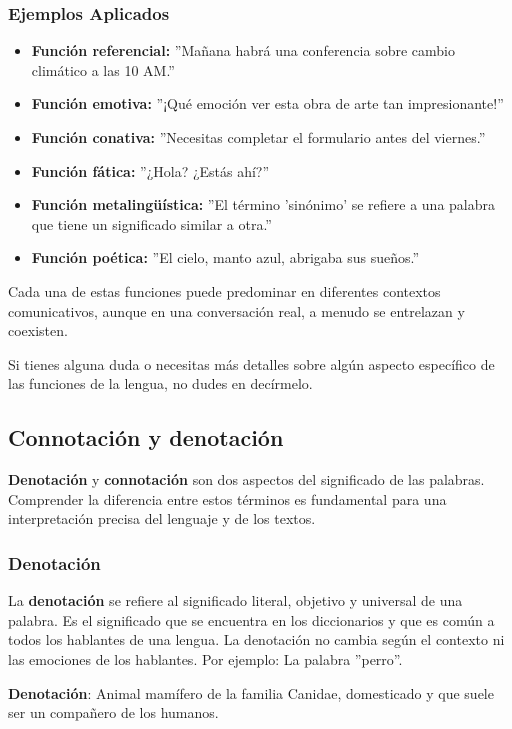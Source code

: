 \subsubsection{Ejemplos Aplicados}
\begin{itemize}
      \item \textbf{Función referencial:} ''Mañana habrá una conferencia sobre cambio climático a las 10 AM.''
      \item \textbf{Función emotiva:} ''¡Qué emoción ver esta obra de arte tan impresionante!''
      \item \textbf{Función conativa:} ''Necesitas completar el formulario antes del viernes.''
      \item \textbf{Función fática:} ''¿Hola? ¿Estás ahí?''
      \item \textbf{Función metalingüística:} ''El término 'sinónimo' se refiere a una palabra que tiene un significado similar a otra.''
      \item \textbf{Función poética:} ''El cielo, manto azul, abrigaba sus sueños.''
\end{itemize}

Cada una de estas funciones puede predominar en diferentes contextos comunicativos, aunque en una conversación real, a menudo se entrelazan y coexisten.

Si tienes alguna duda o necesitas más detalles sobre algún aspecto específico de las funciones de la lengua, no dudes en decírmelo.

\subsection{Connotación y denotación}

\textbf{Denotación} y \textbf{connotación} son dos aspectos del significado de las palabras. Comprender la diferencia entre estos términos es fundamental para una interpretación precisa del lenguaje y de los textos.

\subsubsection{Denotación}
La \textbf{denotación} se refiere al significado literal, objetivo y universal de una palabra. Es el significado que se encuentra en los diccionarios y que es común a todos los hablantes de una lengua. La denotación no cambia según el contexto ni las emociones de los hablantes. Por ejemplo: La palabra ''perro''.

\textbf{Denotación}: Animal mamífero de la familia Canidae, domesticado y que suele ser un compañero de los humanos.

